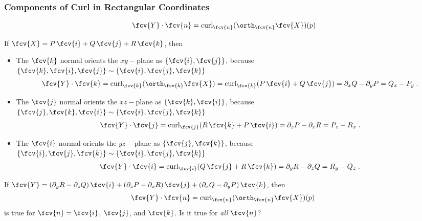 \begin{frame}
  \frametitle{Components of Curl in Rectangular Coordinates}

$$\fcv{Y} \cdot \fcv{n} = \text{curl}_{\fcv{n}} (\orth_{\fcv{n}} \fcv{X})(p)$$

If $\fcv{X}=P \, \fcv{i} + Q\, \fcv{j} + R\, \fcv{k}$, then
\begin{itemize}
  \item The $\fcv{k}$ normal orients the $xy-$plane as $\{ \fcv{i}, \fcv{j}\}$, because $\{\fcv{k}, \fcv{i}, \fcv{j}\} \sim \{\fcv{i}, \fcv{j}, \fcv{k}\}$
%
$$\fcv{Y} \cdot \fcv{k} = \text{curl}_{\fcv{k}} (\orth_{\fcv{k}} \fcv{X}) = \text{curl}_{\fcv{k}} (P\, \fcv{i} + Q\, \fcv{j}) = \partial_x Q - \partial_y P = Q_x - P_y\; .$$
%
\item \pause The $\fcv{j}$ normal orients the $xz-$plane as \pause $\{ \fcv{k}, \fcv{i}\}$, because $\{\fcv{j}, \fcv{k}, \fcv{i}\} \sim \{\fcv{i}, \fcv{j}, \fcv{k}\}$\pause
%
$$\fcv{Y} \cdot \fcv{j} = \text{curl}_{\fcv{j}} (R\, \fcv{k} + P\, \fcv{i}) = \partial_z P - \partial_x R = P_z - R_x\; .$$
%
\item \pause The $\fcv{i}$ normal orients the $yz-$plane as \pause $\{ \fcv{j}, \fcv{k}\}$, because $\{\fcv{i}, \fcv{j}, \fcv{k}\} \sim \{\fcv{i}, \fcv{j}, \fcv{k}\}$\pause
%
$$\fcv{Y} \cdot \fcv{i} = \text{curl}_{\fcv{i}} (Q\, \fcv{j} + R\, \fcv{k}) = \partial_y R - \partial_z Q = R_y - Q_z\; .$$
\end{itemize}

\pause If $\fcv{Y} = (\partial_y R - \partial_z Q) \, \fcv{i} +  (\partial_z P - \partial_x R) \, \fcv{j} + (\partial_x Q - \partial_y P) \, \fcv{k}$,
then
%
$$\fcv{Y} \cdot \fcv{n} = \text{curl}_{\fcv{n}} (\orth_{\fcv{n}} \fcv{X})(p) \; $$
%
is true for $\fcv{n} = \fcv{i}$, $\fcv{j}$, and $\fcv{k}$. \pause Is it true for \emph{all} $\fcv{n}$?

\end{frame}
